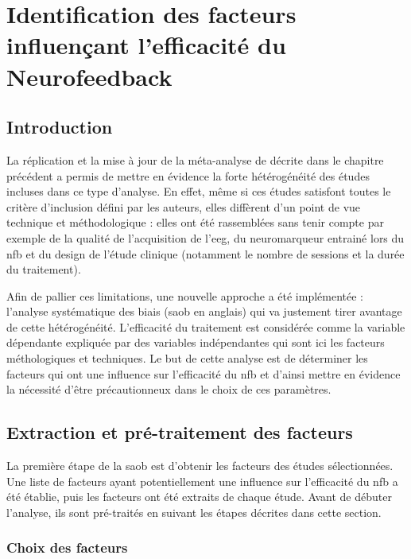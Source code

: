 \chapter{Identification des facteurs influençant l'efficacité du Neurofeedback}

\section*{Introduction}

La réplication et la mise à jour de la méta-analyse de \citet{Cortese2016} décrite dans le chapitre précédent a permis de mettre en évidence la forte hétérogénéité des études incluses dans ce type d'analyse. 
En effet, même si ces études satisfont toutes le critère d'inclusion défini par les auteurs, elles diffèrent d'un point de vue technique et méthodologique : elles ont été rassemblées 
sans tenir compte par exemple de la qualité de l'acquisition de l'\gls{eeg}, du neuromarqueur entrainé lors du \gls{nfb} et du design de l'étude clinique (notamment le nombre de 
sessions et la durée du traitement). 

Afin de pallier ces limitations, une nouvelle approche a été implémentée : l'analyse systématique des biais (\gls{saob} en anglais) qui va justement tirer avantage de cette hétérogénéité. 
L'efficacité du traitement est considérée comme la variable dépendante expliquée par des variables indépendantes qui sont ici les facteurs méthologiques et techniques. 
Le but de cette analyse est de déterminer les facteurs qui ont une influence sur l'efficacité du \gls{nfb} et d'ainsi mettre en évidence la nécessité d'être
précautionneux dans le choix de ces paramètres. 

\section{Extraction et pré-traitement des facteurs}

La première étape de la \gls{saob} est d'obtenir les facteurs des études sélectionnées. Une liste de facteurs ayant potentiellement une influence sur l'efficacité du \gls{nfb} a été 
établie, puis les facteurs ont été extraits de chaque étude. Avant de débuter l'analyse, ils sont pré-traités en suivant les étapes décrites dans cette section. 

\subsection{Choix des facteurs} \label{choix_des_facteurs}

